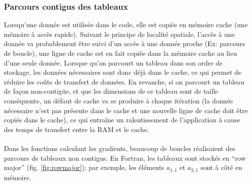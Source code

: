 \subsubsection{Parcours contigus des tableaux}
Lorsqu'une donnée est utilisée dans le code, elle est copiée en mémoire cache (une mémoire à accès rapide). Suivant le principe de localité spatiale, l'accès à une donnée va probablement être suivi d'un accès à une donnée proche (Ex: parcours de boucle), une ligne de cache est en fait copiée dans la mémoire cache au lieu d'une seule donnée. 
Lorsque qu'on parcourt un tableau dans son ordre de stockage, les données nécessaires sont donc déjà dans le cache, ce qui permet de réduire les coûts de transfert de données. En revanche, si on parcourt un tableau de façon non-contigüe, et que les dimensions de ce tableau sont de taille conséquente, un défaut de cache va se produire à chaque itération (la donnée nécessaire n'est pas présente dans le cache et une nouvelle ligne de cache doit être copiée dans le cache), ce qui entraîne un ralentissement de l'application à cause des temps de transfert entre la RAM et le cache.


\paragraph{}Dans les fonctions calculant les gradients, beaucoup de boucles réalisaient des parcours de tableaux non contigus. En Fortran, les tableaux sont stockés en ``row major'' (fig. \ref{fig:rowmajor}); par exemple, les éléments $a_{1,1}$ et $a_{2,1}$ sont à côté en mémoire.

